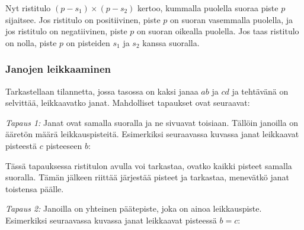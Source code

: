 Nyt ristitulo $(p-s_1) \times (p-s_2)$
kertoo, kummalla puolella suoraa piste $p$ sijaitsee.
Jos ristitulo on positiivinen,
piste $p$ on suoran vasemmalla puolella,
ja jos ristitulo on negatiivinen,
piste $p$ on suoran oikealla puolella.
Jos taas ristitulo on nolla,
piste $p$ on pisteiden $s_1$ ja $s_2$
kanssa suoralla.

\subsubsection{Janojen leikkaaminen}


Tarkastellaan tilannetta, jossa tasossa on kaksi
janaa $ab$ ja $cd$ ja tehtävänä on selvittää,
leikkaavatko janat. Mahdolliset tapaukset ovat seuraavat:

\textit{Tapaus 1:}
Janat ovat samalla suoralla ja ne sivuavat toisiaan.
Tällöin janoilla on ääretön määrä leikkauspisteitä.
Esimerkiksi seuraavassa kuvassa janat leikkaavat
pisteestä $c$ pisteeseen $b$:
\begin{center}
\end{center}

Tässä tapauksessa ristitulon avulla voi tarkastaa,
ovatko kaikki pisteet samalla suoralla.
Tämän jälkeen riittää järjestää pisteet ja
tarkastaa, menevätkö janat toistensa päälle.

\textit{Tapaus 2:}
Janoilla on yhteinen päätepiste, joka on
ainoa leikkauspiste.
Esimerkiksi seuraavassa kuvassa
janat leikkaavat pisteessä $b=c$:

\begin{center}
\end{center}

